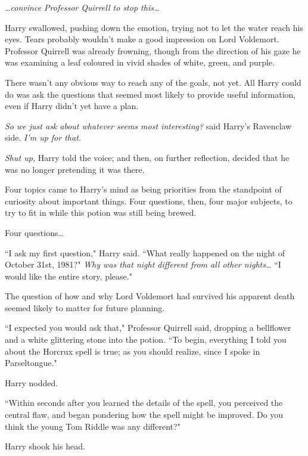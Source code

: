 \emph{{\ldots}convince Professor Quirrell to \emph{stop this{\ldots}}}

Harry swallowed, pushing down the emotion, trying not to let the water reach his eyes. Tears probably wouldn't make a good impression on Lord Voldemort. Professor Quirrell was already frowning, though from the direction of his gaze he was examining a leaf coloured in vivid shades of white, green, and purple.

There wasn't any obvious way to reach any of the goals, not yet. All Harry could do was ask the questions that seemed most likely to provide useful information, even if Harry didn't yet have a plan.

\emph{So we just ask about whatever seems most interesting?} said Harry's Ravenclaw side. \emph{I'm up for that.}

\emph{Shut up,} Harry told the voice; and then, on further reflection, decided that he was no longer pretending it was there.

Four topics came to Harry's mind as being priorities from the standpoint of curiosity about important things. Four questions, then, four major subjects, to try to fit in while this potion was still being brewed.

Four questions{\ldots}

``I ask my first question," Harry said. ``What really happened on the night of October 31st, 1981?" \emph{Why was that night different from all other nights{\ldots}} ``I would like the entire story, please."

The question of how and why Lord Voldemort had survived his apparent death seemed likely to matter for future planning.

``I expected you would ask that," Professor Quirrell said, dropping a bellflower and a white glittering stone into the potion. ``To begin, everything I told you about the Horcrux spell is true; as you should realize, since I spoke in Parseltongue."

Harry nodded.

``Within seconds after you learned the details of the spell, you perceived the central flaw, and began pondering how the spell might be improved. Do you think the young Tom Riddle was any different?"

Harry shook his head.

